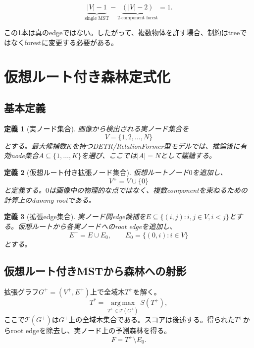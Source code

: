 \documentclass[11pt,a4paper]{article}
\newtheorem{definition}{定義}
\newcommand{\argmax}{\operatorname*{arg\,max}}
\begin{document}
\begin{equation}
  \underbrace{|V|-1}_{\text{single MST}}
  -
  \underbrace{(|V|-2)}_{\text{2-component forest}}
  =1.
\end{equation}

この1本は真のedgeではない。したがって、複数物体を許す場合、制約はtreeではなくforestに変更する必要がある。

\section{仮想ルート付き森林定式化}
\subsection{基本定義}
\begin{definition}[実ノード集合]
画像から検出される実ノード集合を
\begin{equation}
  V=\{1,2,\ldots,N\}
\end{equation}
とする。最大候補数$K$を持つDETR/RelationFormer型モデルでは、推論後に有効node集合$A\subseteq\{1,\ldots,K\}$を選び、ここでは$|A|=N$として議論する。
\end{definition}

\begin{definition}[仮想ルート付き拡張ノード集合]
仮想ルートノード$0$を追加し、
\begin{equation}
  V^+ = V\cup\{0\}
\end{equation}
と定義する。$0$は画像中の物理的な点ではなく、複数componentを束ねるための計算上のdummy rootである。
\end{definition}

\begin{definition}[拡張edge集合]
実ノード間edge候補を$E\subseteq\{(i,j):i,j\in V, i<j\}$とする。仮想ルートから各実ノードへのroot edgeを追加し、
\begin{equation}
  E^+ = E \cup E_0,
  \qquad
  E_0=\{(0,i):i\in V\}
\end{equation}
とする。
\end{definition}

\subsection{仮想ルート付きMSTから森林への射影}
拡張グラフ$G^+=(V^+,E^+)$上で全域木$T^+$を解く。
\begin{equation}
  T^* = \argmax_{T^+\in\mathcal{T}(G^+)} S(T^+),
  \label{eq:augmented_mst}
\end{equation}
ここで$\mathcal{T}(G^+)$は$G^+$上の全域木集合である。スコアは後述する。得られた$T^+$からroot edgeを除去し、実ノード上の予測森林を得る。
\begin{equation}
  F = T^+ \setminus E_0.
  \label{eq:remove_root_edges}
\end{equation}
\end{document}
